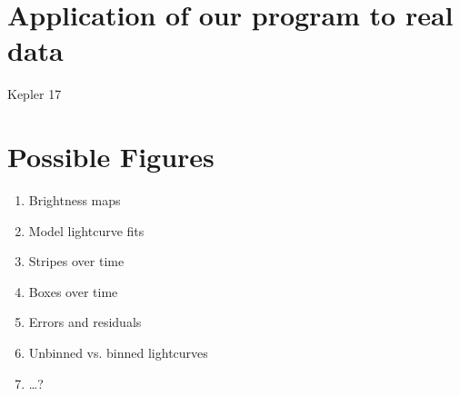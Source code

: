 \documentclass[iop]{emulateapj}
\begin{document}
%

\section{Application of our program to real data}
Kepler 17





\section{Possible Figures \label{figures}}
	\begin{enumerate}
		\item Brightness maps
		\item Model lightcurve fits
		\item Stripes over time
		\item Boxes over time
		\item Errors and residuals
		\item Unbinned vs. binned lightcurves
		\item \ldots?
	\end{enumerate}
\end{document}
